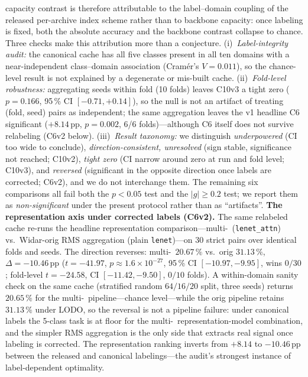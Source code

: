 \documentclass[journal,11pt]{IEEEtran}
\newcommand{\Rx}{\text{Rx}}
\begin{document}
capacity contrast is therefore attributable to the label--domain coupling of the released per-archive index scheme rather than to backbone capacity: once labeling is fixed, both the absolute accuracy and the backbone contrast collapse to chance. Three checks make this attribution more than a conjecture. (i)~\emph{Label-integrity audit:} the canonical cache has all five classes present in all ten domains with a near-independent class--domain association (Cram\'er's $V = 0.011$), so the chance-level result is not explained by a degenerate or mis-built cache. (ii)~\emph{Fold-level robustness:} aggregating seeds within fold (10 folds) leaves C10v3 a tight zero ($p = 0.166$, 95\,\% CI $[-0.71, +0.14]$), so the null is not an artifact of treating (fold, seed) pairs as independent; the same aggregation leaves the v1 headline C6 significant ($+8.14$\,pp, $p = 0.002$, 6/6 folds)---although C6 itself does not survive relabeling (C6v2 below). (iii)~\emph{Result taxonomy:} we distinguish \emph{underpowered} (CI too wide to conclude), \emph{direction-consistent, unresolved} (sign stable, significance not reached; C10v2), \emph{tight zero} (CI narrow around zero at run and fold level; C10v3), and \emph{reversed} (significant in the opposite direction once labels are corrected; C6v2), and we do not interchange them. The remaining six comparisons all fail both the $p < 0.05$ test and the $|g| \geq 0.2$ test; we report them as \emph{non-significant} under the present protocol rather than as ``artifacts''. \textbf{The representation axis under corrected labels (C6v2).} The same relabeled cache re-runs the headline representation comparison---multi-\Rx\ (\texttt{lenet\_attn}) vs.\ Widar-orig RMS aggregation (plain \texttt{lenet})---on 30 strict pairs over identical folds and seeds. The direction reverses: multi-\Rx\ $20.67\,\%$ vs.\ orig $31.13\,\%$, $\Delta = -10.46$\,pp ($t = -41.97$, $p \approx 1.6\times10^{-27}$, 95\,\% CI $[-10.97, -9.95]$, wins $0/30$; fold-level $t = -24.58$, CI $[-11.42, -9.50]$, $0/10$ folds). A within-domain sanity check on the same cache (stratified random $64/16/20$ split, three seeds) returns $20.65\,\%$ for the multi-\Rx\ pipeline---chance level---while the orig pipeline retains $31.13\,\%$ under LODO, so the reversal is not a pipeline failure: under canonical labels the 5-class task is at floor for the multi-\Rx\ representation-model combination, and the simpler RMS aggregation is the only side that extracts real signal once labeling is corrected. The representation ranking inverts from $+8.14$ to $-10.46$\,pp between the released and canonical labelings---the audit's strongest instance of label-dependent optimality.
\end{document}
